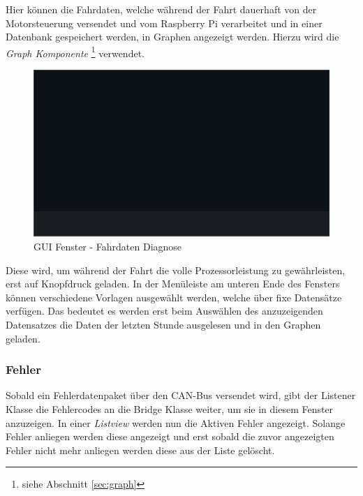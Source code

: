 Hier können die Fahrdaten, welche während der Fahrt dauerhaft von der Motorsteuerung versendet und vom Raspberry Pi verarbeitet und in einer Datenbank gespeichert werden, in Graphen angezeigt werden. Hierzu wird die \textit{Graph Komponente} \footnote{siehe Abschnitt \ref{sec:graph}} verwendet.
\begin{figure}[H]
	\begin{center}
		\includegraphics[scale=0.25]{figures/hcis/window_diagnosis.png}
			\caption{GUI Fenster - Fahrdaten Diagnose}
			\label{fig:pageDiagnose}
	\end{center}
\end{figure}

 Diese wird, um während der Fahrt die volle Prozessorleistung zu gewährleisten, erst auf Knopfdruck geladen. In der Menüleiste am unteren Ende des Fensters können verschiedene Vorlagen ausgewählt werden, welche über fixe Datensätze verfügen. Das bedeutet es werden erst beim Auswählen des anzuzeigenden Datensatzes die Daten der letzten Stunde ausgelesen und in den Graphen geladen.


\newpage

\subsubsection{Fehler}

Sobald ein Fehlerdatenpaket über den CAN-Bus versendet wird, gibt der Listener Klasse die Fehlercodes an die Bridge Klasse weiter, um sie in diesem Fenster anzuzeigen. In einer \textit{Listview} werden nun die Aktiven Fehler angezeigt. Solange Fehler anliegen werden diese angezeigt und erst sobald die zuvor angezeigten Fehler nicht mehr anliegen werden diese aus der Liste gelöscht.

